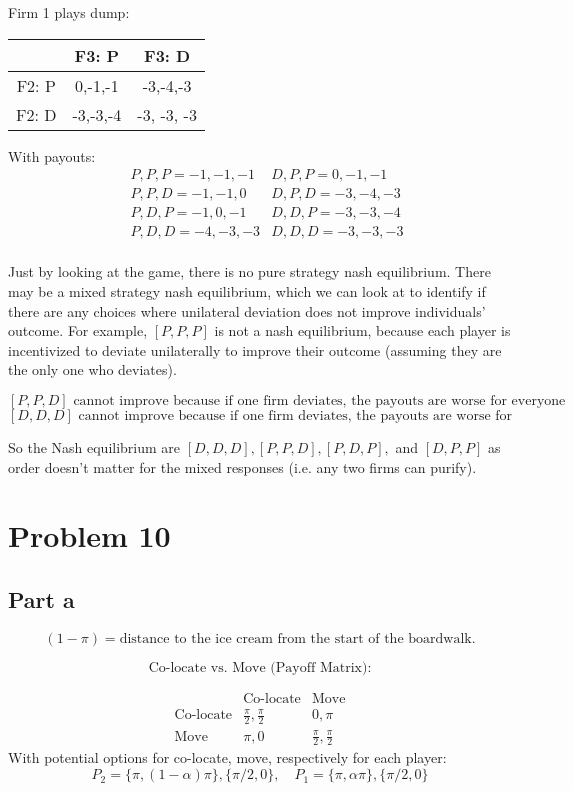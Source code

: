 \documentclass{article}
\begin{document}
\begin{table}[H]
\centering
Firm 1 plays dump: 
\begin{tabular}{c|c|c}
    & F3: P & F3: D \\ \hline
F2: P   & 0,-1,-1& -3,-4,-3 \\
F2: D   & -3,-3,-4 & -3, -3, -3\\
\end{tabular}
\end{table}

With payouts: 
\[
\quad
\begin{array}{c|c}
P, P, P = -1, -1, -1 & D, P, P = 0, -1, -1 \\
P, P, D = -1, -1, 0  & D, P, D = -3, -4, -3 \\
P, D, P = -1, 0, -1  & D, D, P = -3, -3, -4 \\
P, D, D = -4, -3, -3 & D, D, D = -3, -3, -3 \\
\end{array}
\]

Just by looking at the game, there is no pure strategy nash equilibrium. There may be a mixed strategy nash equilibrium, which we can look at to identify if there are any choices where unilateral deviation does not improve individuals' outcome. For example, $[P,P,P]$ is not a nash equilibrium, because each player is incentivized to deviate unilaterally to improve their outcome (assuming they are the only one who deviates). 

\[
[P,P,D] \text{ cannot improve because if one firm deviates, the payouts are worse for everyone}
\]
\[
[D,D,D] \text{ cannot improve because if one firm deviates, the payouts are worse for themselves}
\]

So the Nash equilibrium are $[D,D,D], [P,P,D], [P,D,P],$ and $[D, P, P]$ as order doesn't matter for the mixed responses (i.e. any two firms can purify). 


\section{Problem 10}

\subsection{Part a}
\[
(1 - \pi) = \text{distance to the ice cream from the start of the boardwalk.}
\]

\[
\text{Co-locate vs. Move (Payoff Matrix):}
\]

\[
\begin{array}{c|c|c}
& \text{Co-locate} & \text{Move} \\
\hline
\text{Co-locate} & \frac{\pi}{2}, \frac{\pi}{2} & 0, \pi \\
\text{Move} & \pi, 0 & \frac{\pi}{2}, \frac{\pi}{2}
\end{array}
\]
With potential options for co-locate, move, respectively for each player: 
\[
P_2 = \{ \pi, (1-\alpha)\pi \}, \{ \pi/2, 0 \}, \quad P_1 = \{ \pi, \alpha \pi \}, \{ \pi/2, 0 \}
\]
\end{document}
